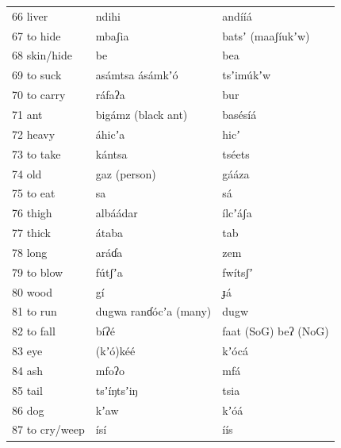 \documentclass[output=paper]{langsci/langscibook}
\begin{document}
\begin{longtable}{p{}  p{} p{}}
66 liver & ndihi & and\'{i}\'{i}\'{a} \\

67 to hide & mbaʃia & batsʼ (maaʃ\'{i}ukʼw) \\

68 skin/hide & be & bea \\

69 to suck & as\'{a}mtsa   \'{a}s\'{a}mkʼ\'{o} & tsʼim\'{u}kʼw \\

70 to carry & r\'{a}faʔa & bur \\

71 ant & big\'{a}mz    (black ant) & bas\'{e}s\'{i}\'{a} \\

72 heavy & \'{a}hicʼa & hicʼ \\

73 to take & k\'{a}ntsa & ts\'{e}ets \\

74 old & gaz   (person) & g\'{a}\'{a}za \\

75 to eat & sa & s\'{a} \\

76 thigh & alb\'{a}\'{a}dar & \'{i}lcʼ\'{a}ʃa \\

77 thick & \'{a}taba & tab \\

78 long & ar\'{a}ɗa & zem \\

79 to blow & f\'{u}tʃʼa & fw\'{i}tsʃʼ \\

80 wood & g\'{i} & ɟ\'{a} \\

81 to run & dugwa     ranɗ\'{o}cʼa   (many) & dugw \\

82 to fall & b\'{i}ʔ\'{e} & faat (SoG)   beʔ (NoG) \\

83 eye & (kʼ\'{o})k\'{e}\'{e} & kʼ\'{o}c\'{a} \\

84 ash & mfoʔo & mf\'{a} \\

85 tail & tsʼ\'{i}ŋtsʼiŋ & tsia \\

86 dog & kʼaw & kʼ\'{o}\'{a} \\

87 to cry/weep & \'{i}s\'{i} & \'{i}\'{i}s \\


\end{longtable}
\end{document}

